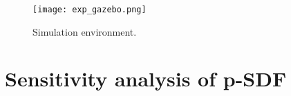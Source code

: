 
\begin{figure}[!htbp] 
\centering
\texttt{[image: exp\_gazebo.png]}%
\caption{Simulation environment.}
\label{fig:gazebo_sim}
\end{figure}	

\section{Sensitivity analysis of p-SDF}
